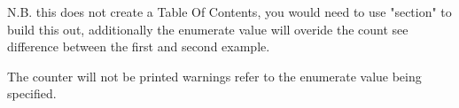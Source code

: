 \documentclass{report}
\begin{document}
N.B. this does not create a Table Of Contents, you would need to use "section" to build this out, additionally the enumerate value will overide the count see difference between the first and second example.

The counter will not be printed warnings refer to the enumerate value being specified.
\clearpage
\end{document}
